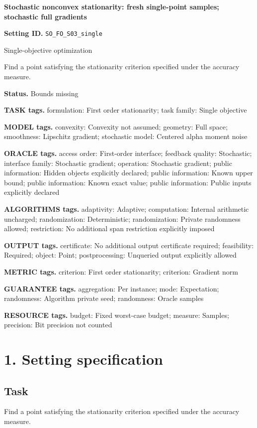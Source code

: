 \documentclass[10pt,a4paper]{article}
\begin{document}
\raggedright

{\LARGE\bfseries\sffamily\color{AtlasNavy} Stochastic nonconvex stationarity: fresh single-point samples; stochastic full gradients\par}\vspace{5pt}
\textbf{Setting ID.} \texttt{SO\_\allowbreak{}FO\_\allowbreak{}S03\_\allowbreak{}single}

Single-objective optimization

Find a point satisfying the stationarity criterion specified under the accuracy measure.

\textbf{Status.} Bounds missing

\textbf{TASK tags.} formulation: First order stationarity; task family: Single objective

\textbf{MODEL tags.} convexity: Convexity not assumed; geometry: Full space; smoothness: Lipschitz gradient; stochastic model: Centered alpha moment noise

\textbf{ORACLE tags.} access order: First-order interface; feedback quality: Stochastic; interface family: Stochastic gradient; operation: Stochastic gradient; public information: Hidden objects explicitly declared; public information: Known upper bound; public information: Known exact value; public information: Public inputs explicitly declared

\textbf{ALGORITHMS tags.} adaptivity: Adaptive; computation: Internal arithmetic uncharged; randomization: Deterministic; randomization: Private randomness allowed; restriction: No additional span restriction explicitly imposed

\textbf{OUTPUT tags.} certificate: No additional output certificate required; feasibility: Required; object: Point; postprocessing: Unqueried output explicitly allowed

\textbf{METRIC tags.} criterion: First order stationarity; criterion: Gradient norm

\textbf{GUARANTEE tags.} aggregation: Per instance; mode: Expectation; randomness: Algorithm private seed; randomness: Oracle samples

\textbf{RESOURCE tags.} budget: Fixed worst-case budget; measure: Samples; precision: Bit precision not counted

\section{1. Setting specification}
\subsection{Task}
Find a point satisfying the stationarity criterion specified under the accuracy measure.
\end{document}
